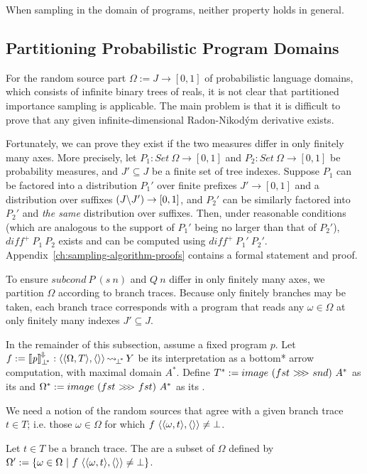 When sampling in the domain of programs, neither property holds in general.

\subsection{Partitioning Probabilistic Program Domains}

For the random source part $\Omega := J \to [0,1]$ of probabilistic language domains, which consists of infinite binary trees of reals, it is not clear that partitioned importance sampling is applicable.
The main problem is that it is difficult to prove that any given infinite-dimensional Radon-Nikod\'ym derivative exists.

Fortunately, we can prove they exist if the two measures differ in only finitely many axes.
More precisely, let $P_1 : Set~\Omega \to [0,1]$ and $P_2 : Set~\Omega \to [0,1]$ be probability measures, and $J' \subseteq J$ be a finite set of tree indexes.
Suppose $P_1$ can be factored into a distribution $P_1'$ over finite prefixes $J' \to [0,1]$ and a distribution over suffixes $(J \backslash J') \to [0,1]$, and $P_2'$ can be similarly factored into $P_2'$ and \emph{the same} distribution over suffixes.
Then, under reasonable conditions (which are analogous to the support of $P_1'$ being no larger than that of  $P_2'$), $diff^+~P_1~P_2$ exists and can be computed using $diff^+~P_1'~P_2'$.
Appendix~\ref{ch:sampling-algorithm-proofs} contains a formal statement and proof.

To ensure $subcond~P~(s~n)$ and $Q~n$ differ in only finitely many axes, we partition $\Omega$ according to branch traces.
Because only finitely branches may be taken, each branch trace corresponds with a program that reads any $\omega \in \Omega$ at only finitely many indexes $J' \subseteq J$.

In the remainder of this subsection, assume a fixed program $\mathit{p}$. Let $f := \left\llbracket{\mathit{p}}\right\rrbracket^{\mspace{-2mu}\Downarrow\mspace{-2mu}}_{\bot^{\mspace{-4mu}*}} : \langle{\langle{\Omega,T}\rangle,\langle{}\rangle}\rangle \operatorname{\rightsquigarrow_{\mspace{-3mu}{\bot^{\mspace{-4mu}*}}}} Y$ be its interpretation as a bottom* arrow computation, with maximal domain $A^*$.
Define $T^* := image~(fst~{>}\mspace{-6mu}{>}\mspace{-6mu}{>}~snd)~A^*$ as its  and
$\Omega^* := image~(fst~{>}\mspace{-6mu}{>}\mspace{-6mu}{>}~fst)~A^*$ as its .

We need a notion of the random sources that agree with a given branch trace $t \in T$; i.e. those $\omega \in \Omega$ for which $f~\langle{\langle{\omega,t}\rangle,\langle{}\rangle}\rangle \neq \bot$.

\begin{definition}
\label{def:induced-random-sources}
Let $t \in T$ be a branch trace. The  are a subset of $\Omega$ defined by
$\Omega' := \lbrace {\omega \in \Omega} \ \lvert\ {f~\langle{\langle{\omega,t}\rangle,\langle{}\rangle}\rangle \neq \bot} \rbrace$.
\end{definition}

